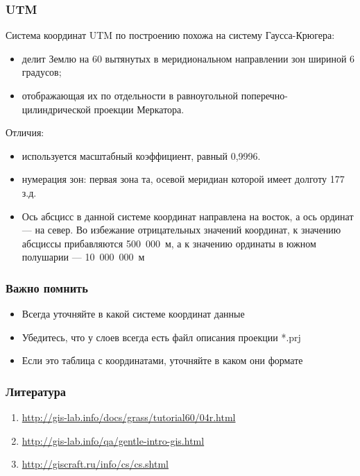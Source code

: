 \begin{frame}
    \frametitle{UTM}
    Система координат UTM по построению похожа на систему Гаусса-Крюгера:
    \begin{itemize}
        \item делит Землю на 60 вытянутых в меридиональном направлении зон шириной 6 градусов;
        \item отображающая их по отдельности в равноугольной поперечно-цилиндрической проекции Меркатора.
    \end{itemize}

     Отличия:
     \begin{itemize}
         \item используется масштабный коэффициент, равный 0,9996.%
         \item нумерация зон: первая зона та, осевой меридиан которой имеет долготу 177 з.д. %
         \item Ось абсцисс в данной системе координат направлена на восток, а ось ординат --- на север. Во избежание отрицательных значений координат, к значению абсциссы прибавляются 500~000~м, а к значению ординаты в южном полушарии --- 10~000~000~м
     \end{itemize}
\end{frame}

\begin{frame}
    \frametitle{Важно помнить}
    \begin{itemize}
        \item Всегда уточняйте в какой системе координат данные
        \item Убедитесь, что у слоев всегда есть файл описания проекции *.prj
        \item Если это таблица с координатами, уточняйте в каком они формате
    \end{itemize}
\end{frame}



\begin{frame}
    \frametitle{Литература}
    \begin{enumerate}
        \item \url{http://gis-lab.info/docs/grass/tutorial60/04r.html}
        \item \url{http://gis-lab.info/qa/gentle-intro-gis.html}
        \item \url{http://giscraft.ru/info/cs/cs.shtml}
    \end{enumerate}
\end{frame}




